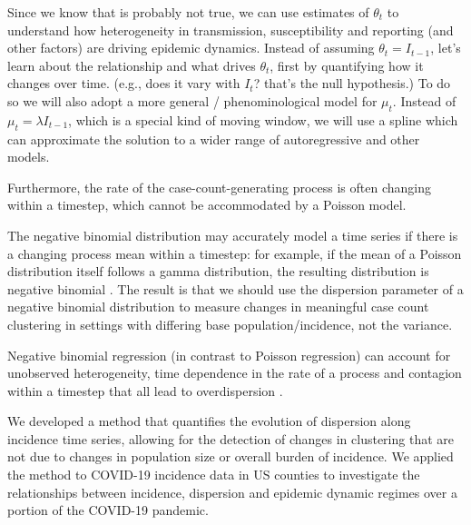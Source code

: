 \documentclass[10pt,letterpaper]{article}
\begin{document}
Since we know that is probably not true, we can use estimates of $\theta_t$ to understand how heterogeneity in transmission, susceptibility and reporting (and other factors) are driving epidemic dynamics. Instead of assuming $\theta_t = I_{t-1}$, let's learn about the relationship and what drives $\theta_t$, first by quantifying how it changes over time. (e.g., does it vary with $I_t$? that's the null hypothesis.) To do so we will also adopt a more general / phenominological model for $\mu_t$. Instead of $\mu_t = \lambda I_{t-1}$, which is a special kind of moving window, we will use a spline which can approximate the solution to a wider range of autoregressive and other models.

Furthermore, the rate of the case-count-generating process is often changing within a timestep, which cannot be accommodated by a Poisson model. 

The negative binomial distribution may accurately model a time series if there is a changing process mean within a timestep: for example, if the mean of a Poisson distribution itself follows a gamma distribution, the resulting distribution is negative binomial \cite{cook_notes_nodate}. 
The result is that we should use the dispersion parameter of a negative binomial distribution to measure changes in meaningful case count clustering in settings with differing base population/incidence, not the variance. 

\noindent Negative binomial regression (in contrast to Poisson regression) can account for unobserved heterogeneity, time dependence in the rate of a process and contagion within a timestep that all lead to overdispersion \cite{barron_analysis_1992}.

We developed a method that quantifies the evolution of dispersion along incidence time series, allowing for the detection of changes in clustering that are not due to changes in population size or overall burden of incidence.
We applied the method to COVID-19 incidence data in US counties to investigate the relationships between incidence, dispersion and epidemic dynamic regimes over a portion of the COVID-19 pandemic. 
\end{document}
